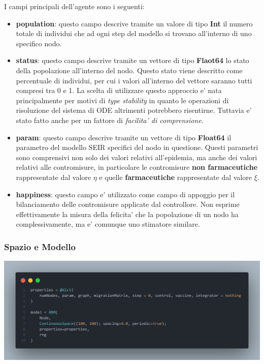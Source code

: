 I campi principali dell'agente sono i seguenti:
\begin{itemize}
	\item \textbf{population}: questo campo descrive tramite un valore di tipo \textbf{Int}
	il numero totale di individui che ad ogni step del modello si trovano all'interno di uno 
	specifico nodo. 
	\item \textbf{status}: questo campo descrive tramite un vettore di tipo \textbf{Flaot64}
	lo stato della popolazione all'interno del nodo. Questo stato viene descritto come 
	percentuale di individui, per cui i valori all'interno del vettore saranno tutti compresi 
	tra 0 e 1. La scelta di utilizzare questo approccio e' nata principalmente per motivi di 
	\emph{type stability} in quanto le operazioni di risoluzione del sistema di ODE altrimenti 
	potrebbero risentirne. Tuttavia e' stato fatto anche per un fattore di \emph{facilita' di comprensione}.
	\item \textbf{param}: questo campo descrive tramite un vettore di tipo \textbf{Float64}
	il parametro del modello SEIR specifici del nodo in questione. Questi parametri sono comprensivi 
	non solo dei valori relativi all'epidemia, ma anche dei valori relativi alle contromisure, 
	in particolare le contromisure \textbf{non farmaceutiche} rappresentate dal valore $\eta$
	e quelle \textbf{farmaceutiche} rappresentate dal valore $\xi$.
	\item \textbf{happiness}: questo campo e' utilizzato come campo di appoggio per il bilanciamento
	delle contromisure applicate dal controllore. Non esprime effettivamente la misura della felicita'
	che la popolazione di un nodo ha complessivamente, ma e' comunque uno stimatore similare.
\end{itemize}

\subsubsection{Spazio e Modello}

\begin{minipage}{\linewidth}
    \centering
    \includegraphics[width=\textwidth]{img/sngraph_model.png}
    \label{fig:Model_code}
\end{minipage}

